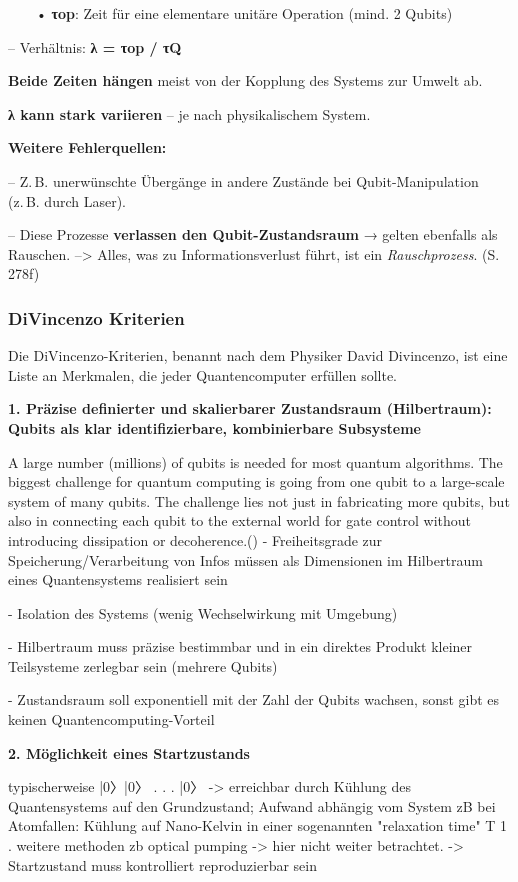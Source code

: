    • \textbf{τop}: Zeit für eine elementare unitäre Operation (mind. 2 Qubits)

 – Verhältnis: \textbf{λ = τop / τQ}
    \item \textbf{Beide Zeiten hängen} meist von der Kopplung des Systems zur Umwelt ab.
    \item \textbf{λ kann stark variieren} – je nach physikalischem System.
    \item \textbf{Weitere Fehlerquellen:}

 – Z. B. unerwünschte Übergänge in andere Zustände bei Qubit-Manipulation (z. B. durch Laser).

 – Diese Prozesse \textbf{verlassen den Qubit-Zustandsraum} → gelten ebenfalls als Rauschen.
--> Alles, was zu Informationsverlust führt, ist ein \textit{Rauschprozess}. (S. 278f)


\subsubsection{DiVincenzo Kriterien}

Die DiVincenzo-Kriterien, benannt nach dem Physiker David Divincenzo, ist eine Liste an Merkmalen, die jeder Quantencomputer erfüllen sollte. 

\textbf{1. Präzise definierter und skalierbarer Zustandsraum (Hilbertraum): Qubits als klar identifizierbare, kombinierbare Subsysteme} 

A large number (millions) of qubits is needed for most quantum algorithms. The
biggest challenge for quantum computing is going from one qubit to a large-scale
system of many qubits. The challenge lies not just in fabricating more qubits, but also
in connecting each qubit to the external world for gate control without introducing
dissipation or decoherence.(\cite{lapierre_introduction_2021})
- Freiheitsgrade zur Speicherung/Verarbeitung von Infos müssen als Dimensionen im Hilbertraum eines Quantensystems realisiert sein 

- Isolation des Systems (wenig Wechselwirkung mit Umgebung) 

- Hilbertraum muss präzise bestimmbar und in ein direktes Produkt kleiner Teilsysteme zerlegbar sein (mehrere Qubits) 

- Zustandsraum soll exponentiell mit der Zahl der Qubits wachsen, sonst gibt es keinen Quantencomputing-Vorteil 

\textbf{{2. Möglichkeit eines Startzustands} }

typischerweise |0〉|0〉 . . . |0〉 \cite{lapierre_introduction_2021} -> erreichbar durch Kühlung des Quantensystems auf den Grundzustand; Aufwand abhängig vom System zB bei Atomfallen: Kühlung auf Nano-Kelvin 
in einer sogenannten "relaxation time" T 1 . weitere methoden zb optical pumping -> hier nicht weiter betrachtet. 
-> Startzustand muss kontrolliert reproduzierbar sein 


